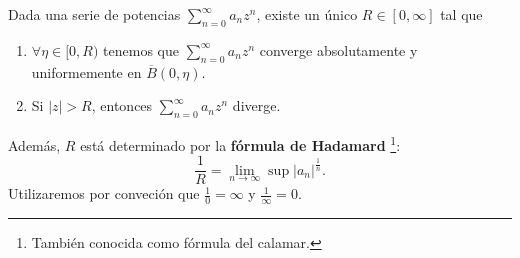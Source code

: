 \begin{theorem}
	Dada una serie de potencias $\displaystyle \sum^{\infty}_{n = 0}a_{n}z^{n} $, existe un único $\displaystyle R \in [0,\infty] $ tal que 
	\begin{enumerate}
	\item $\displaystyle \forall \eta \in [0,R) $ tenemos que $\displaystyle \sum^{\infty}_{n = 0}a_{n}z^{n} $ converge absolutamente y uniformemente en $\displaystyle \overline{B}\left(0,\eta\right) $. 
	\item Si $\displaystyle \left|z\right| > R $, entonces $\displaystyle \sum^{\infty}_{n = 0}a_{n}z^{n} $ diverge.
	\end{enumerate}
	Además, $\displaystyle R $ está determinado por la \textbf{fórmula de Hadamard} \footnote{También conocida como fórmula del calamar.}:
	\[\frac{1}{R}=\lim_{n \to \infty }\sup \left|a_{n}\right|^{\frac{1}{n}} .\]
Utilizaremos por conveción que $\displaystyle \frac{1}{0}=\infty  $ y $\displaystyle \frac{1}{\infty }=0 $. 	
\end{theorem}
